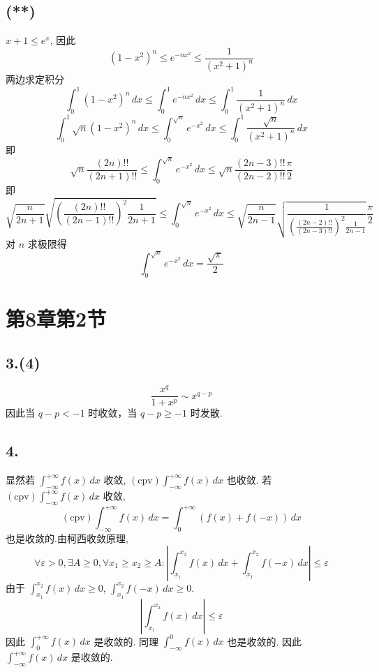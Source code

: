 \documentclass[12pt, a4paper, oneside]{ctexart}
\begin{document}
        \subsection*{(**)}
            $x+1\leq e^x$, 因此
            $$
                (1-x^2)^n\leq e^{-nx^2}\leq\frac{1}{(x^2 + 1)^n}
            $$
            两边求定积分
            $$
                \int_{0}^{1} (1-x^2)^n\,dx \leq \int_{0}^{1}e^{-nx^2}\,dx\leq\int_{0}^{1}\frac{1}{(x^2 + 1)^n}\,dx
            $$
            $$
                \int_{0}^{1} \sqrt{n}(1-x^2)^n\,dx \leq \int_{0}^{\sqrt{n}}e^{-x^2}\,dx\leq\int_{0}^{1}\frac{\sqrt{n}}{(x^2 + 1)^n}\,dx
            $$
            即
            $$
                \sqrt{n}\frac{(2n)!!}{(2n+1)!!}\leq \int_{0}^{\sqrt{n}}e^{-x^2}\,dx\leq \sqrt{n}\frac{(2n-3)!!}{(2n-2)!!}\frac{\pi}{2}
            $$
            即
            $$
                \sqrt{\frac{n}{2n+1}}\sqrt{(\frac{(2n)!!}{(2n-1)!!})^2\frac{1}{2n+1}}\leq \int_{0}^{\sqrt{n}}e^{-x^2}\,dx\leq \sqrt{\frac{n}{2n-1}}\sqrt{\frac{1}{(\frac{(2n-2)!!}{(2n-3)!!})^2\frac{1}{2n-1}}}\frac{\pi}{2}
            $$
            对 $n$ 求极限得
            $$
                \int_{0}^{\sqrt{n}}e^{-x^2}\,dx=\frac{\sqrt{\pi}}{2}
            $$
    \section*{第8章第2节}
        \subsection*{3.(4)}
            $$
                \frac{x^q}{1+x^p}\sim x^{q-p}
            $$
            因此当 $q-p<-1$ 时收敛，当 $q-p\geq -1$ 时发散.
        \subsection*{4.}
            显然若 $\int_{-\infty}^{+\infty}f(x)\,dx$ 收敛, $(\text{cpv})\int_{-\infty}^{+\infty}f(x)\,dx$ 也收敛.
            若 $(\text{cpv})\int_{-\infty}^{+\infty}f(x)\,dx$ 收敛,
            $$
                (\text{cpv})\int_{-\infty}^{+\infty}f(x)\,dx=\int_{0}^{+\infty}(f(x)+f(-x))\,dx
            $$
            也是收敛的.由柯西收敛原理,
            $$
                \forall \varepsilon > 0, \exists A \geq 0, \forall x_1\geq x_2\geq A: |\int_{x_1}^{x_2}f(x)\,dx+\int_{x_1}^{x_2}f(-x)\,dx|\leq \varepsilon
            $$
            由于 $\int_{x_1}^{x_2}f(x)\,dx\geq 0$, $\int_{x_1}^{x_2}f(-x)\,dx\geq 0$.
            $$
                |\int_{x_1}^{x_2}f(x)\,dx|\leq \varepsilon
            $$
            因此 $\int_{0}^{+\infty}f(x)\,dx$ 是收敛的. 同理 $\int_{-\infty}^{0}f(x)\,dx$ 也是收敛的. 因此 $\int_{-\infty}^{+\infty}f(x)\,dx$ 是收敛的.
\end{document}
